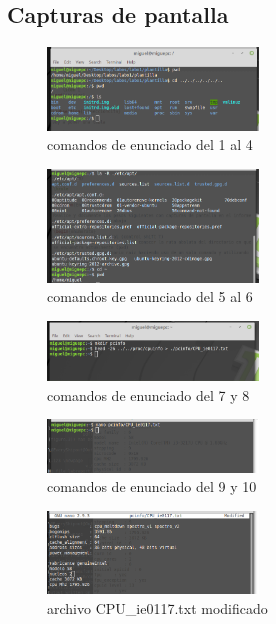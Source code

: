 \documentclass[11pt]{article}
\begin{document}
\subsection{Capturas de pantalla}


\begin{figure}[H]
\centering
\includegraphics[width=0.5\textwidth]{img/1.png}
\caption{comandos de enunciado del 1 al 4}
\end{figure}

\begin{figure}[H]
\centering
\includegraphics[width=0.5\textwidth]{img/2.png}
\caption{comandos de enunciado del 5 al 6}
\end{figure}

\begin{figure}[H]
\centering
\includegraphics[width=0.5\textwidth]{img/3.png}
\caption{comandos de enunciado del 7 y 8}
\end{figure}

\begin{figure}[H]
\centering
\includegraphics[width=0.5\textwidth]{img/4.png}
\caption{comandos de enunciado del 9 y 10}
\end{figure}

\begin{figure}[H]
\centering
\includegraphics[width=0.5\textwidth]{img/5.png}
\caption{archivo CPU\_ie0117.txt modificado}
\end{figure}
\end{document}
